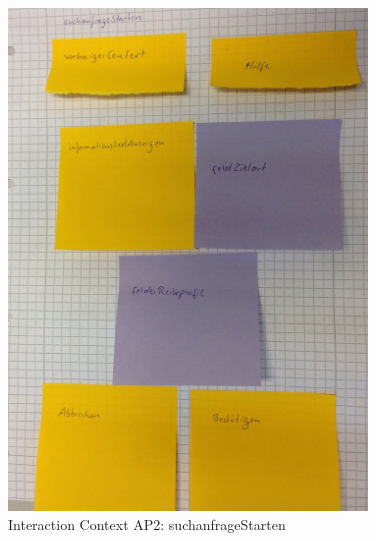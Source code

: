 \begin{figure}[H]
\centering
\includegraphics[angle=90, width=0.85\textwidth]  {./images/abstract/version2/suchanfragenStarten.JPG}
\caption{Interaction Context AP2: suchanfrageStarten}
\label{interfaceContents49}
\end{figure}


